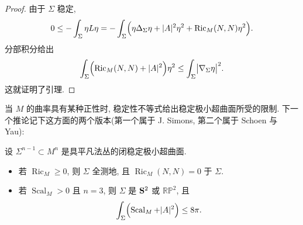 \begin{proof}
由于 $\Sigma$ 稳定,
\begin{equation}
0\leq-\int_{\Sigma}\eta L\eta
 =-\int_{\Sigma}\Bigl(\eta\Delta_{\Sigma}\eta+|A|^{2}\eta^{2}
 +\operatorname{Ric}_M(N,N)\eta^{2}\Bigr).
\label{eq:1.152}
\end{equation}
分部积分给出
\begin{equation}
\int_{\Sigma}\Bigl(\operatorname{Ric}_M(N,N)+|A|^{2}\Bigr)\eta^{2}
 \leq\int_{\Sigma}\bigl|\nabla_{\Sigma}\eta\bigr|^{2}.
\label{eq:1.153}
\end{equation}
这就证明了引理.
\end{proof}

当 $M$ 的曲率具有某种正性时, 稳定性不等式给出稳定极小超曲面所受的限制.
下一个推论记下这方面的两个版本(第一个属于 J. Simons, 第二个属于 Schoen 与
Yau):

\begin{corollary}
\label{cor:1.33}
设 $\Sigma^{n-1}\subset M^n$ 是具平凡法丛的闭稳定极小超曲面.
\begin{itemize}
  \item 若 $\operatorname{Ric}_M\geq0$, 则 $\Sigma$ 全测地, 且
    $\operatorname{Ric}_M(N,N)=0$ 于 $\Sigma$.
  \item 若 $\operatorname{Scal}_M>0$ 且 $n=3$, 则 $\Sigma$ 是 $\mathbf{S}^2$ 或
    $\mathbb{RP}^2$, 且
\begin{equation}
\int_{\Sigma}\Bigl(\operatorname{Scal}_M+|A|^{2}\Bigr)\leq8\pi.
\label{eq:1.154}
\end{equation}
\end{itemize}
\end{corollary}

